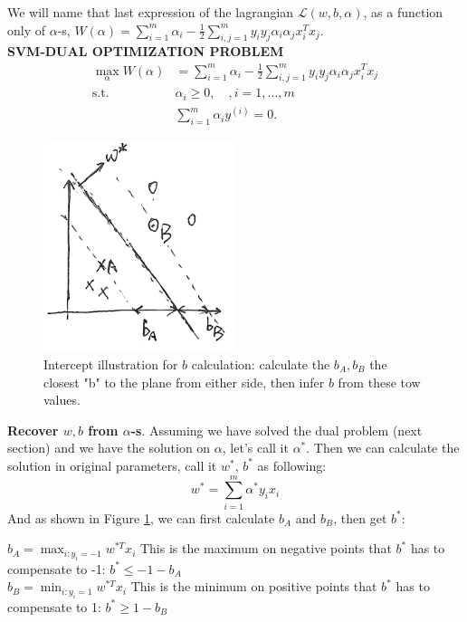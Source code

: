 \documentclass[a4paper]{article}
\begin{document}
We will name that last expression of the lagrangian $\mathcal{L} (w, b, \alpha)$, as a function only of $\alpha$-s, $W(\alpha)=  \sum_{i=1}^{m} \alpha_i - \frac{1}{2} \sum_{i,j=1}^{m} y_i y_j \alpha_i \alpha_j x_i^T x_j$.\\

\textbf{SVM-DUAL OPTIMIZATION PROBLEM}
\begin{align}
	\max_{\alpha} W(\alpha) &= \sum_{i=1}^{m} \alpha_i - \frac{1}{2} \sum_{i,j=1}^{m} y_i y_j \alpha_i \alpha_j x_i^T x_j	\\
		\text{s.t.} \quad & \alpha_i \geq 0, \quad, i = 1, \dots, m \nonumber \\
		& \sum_{i=1}^{m} \alpha_i y^{(i)} = 0. \nonumber
\end{align}

\begin{figure}[h!]
  \centering
    \includegraphics[width=0.5\textwidth]{./images/b}
  \caption{Intercept illustration for $b$ calculation: calculate the $b_A,b_B$ the closest "b" to the plane from either side, then infer $b$ from these tow values.}\label{fig:b}
\end{figure}
\textbf{Recover $w,b$ from $\alpha$-s}. Assuming we have solved the dual problem (next section) and we have the solution on $\alpha$, let's call it $\alpha^\ast$. Then we can calculate the solution in original parameters, call it $w^\ast$, $b^\ast$ as following:
$$
	w^\ast = \sum_{i=1}^{m} \alpha^\ast y_i x_i 
$$
And as shown in Figure \ref{fig:b}, we can first calculate $b_A$ and $b_B$, then get $b^\ast$:

$b_A = \max_{i:y_i = -1} w^{\ast T} x_i $ This is the maximum on negative points that $b^\ast$ has to compensate to -1: $b^\ast\leq -1-b_A$\\

$b_B = \min_{i:y_i = 1} w^{\ast T} x_i$  This is the minimum on positive points that $b^\ast$ has to compensate to 1: $b^\ast\geq 1-b_B$\\
\end{document}
